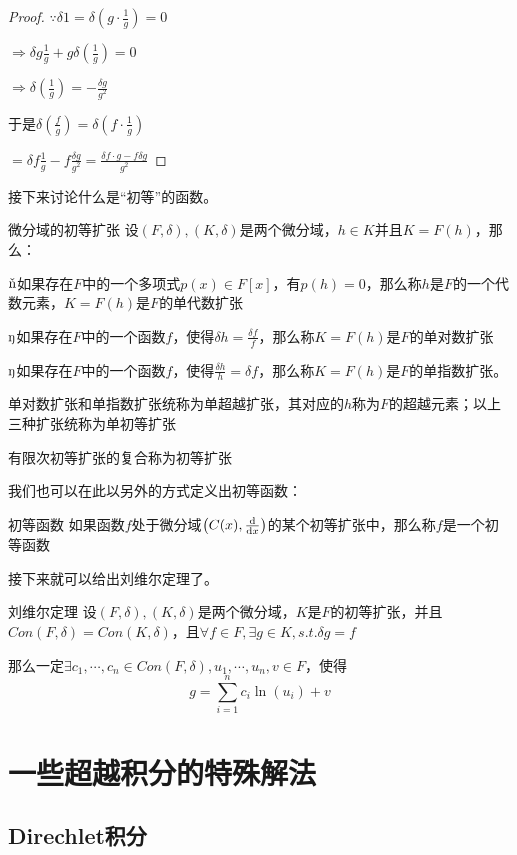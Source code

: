 \documentclass[12pt, a4paper, oneside, UTF8]{ctexbook}
\begin{document}
\begin{para}{0}
\begin{proof}
						$\because \delta 1 = \delta \left(g \cdot \frac{1}{g}\right) = 0$
						
						$\Rightarrow \delta g \frac{1}{g}+g \delta \left(\frac{1}{g}\right)=0$
						
						$\Rightarrow \delta \left(\frac{1}{g}\right) = -\frac{\delta g}{g^2}$
						
						于是$\delta \left(\frac{f}{g}\right) = \delta \left(f \cdot \frac{1}{g}\right)$
						
						$=\delta f \frac{1}{g}-f \frac{\delta g}{g^2} = \frac{\delta f \cdot g - f \delta g}{g^2}$
					\end{proof}
					接下来讨论什么是“初等”的函数。
					\begin{defn}{微分域的初等扩张}{}
						设$(F,\delta),(K,\delta)$是两个微分域，$h \in K$并且$K = F(h)$，那么：
						
						$\ding{172}$如果存在$F$中的一个多项式$p(x) \in F[x]$，有$p(h)=0$，那么称$h$是$F$的一个代数元素，$K=F(h)$是$F$的单代数扩张
						
						$\ding{173}$如果存在$F$中的一个函数$f$，使得$\delta h = \frac{\delta f}{f}$，那么称$K=F(h)$是$F$的单对数扩张
						
						$\ding{173}$如果存在$F$中的一个函数$f$，使得$\frac{\delta h}{h} = \delta f$，那么称$K=F(h)$是$F$的单指数扩张。
						
						单对数扩张和单指数扩张统称为单超越扩张，其对应的$h$称为$F$的超越元素；以上三种扩张统称为单初等扩张
						
						有限次初等扩张的复合称为初等扩张
					\end{defn}
					我们也可以在此以另外的方式定义出初等函数：
					\begin{defn}{初等函数}{}
						如果函数$f$处于微分域$\left(C(x),\frac{\mathrm{d}}{\mathrm{d} x}\right)$的某个初等扩张中，那么称$f$是一个初等函数
					\end{defn}
					接下来就可以给出刘维尔定理了。
					\begin{them}{刘维尔定理}
						设$(F,\delta),(K,\delta)$是两个微分域，$K$是$F$的初等扩张，并且$Con(F,\delta)=Con(K,\delta)$，且$\forall f \in F,\exists g \in K,s.t.\delta g = f$
						
						那么一定$\exists c_1,\cdots,c_n \in Con(F,\delta),u_1,\cdots,u_n,v \in F$，使得
						\begin{equation}
							g = \sum\limits_{i=1}^{n} c_i \ln (u_i)+v
						\end{equation}
					\end{them}
			\end{para}
			
			
	\section{一些超越积分的特殊解法}
		\subsection{Direchlet积分}
		
	
	\ifx\allfiles\undefined
\end{document}
